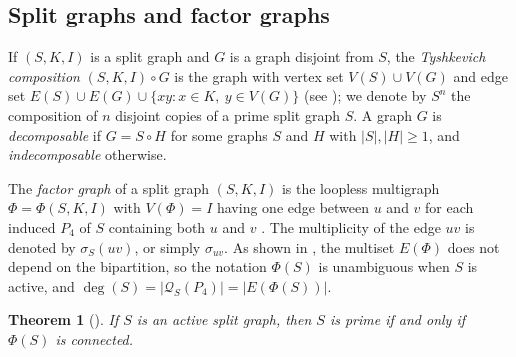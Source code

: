 \documentclass[11pt]{article}
\DeclareMathOperator{\act}{act}
\newtheorem{theorem}{Theorem}[section]
\newtheorem{corollary}[corollary]{Corollary}
\begin{document}

 


\subsection{Split graphs and factor graphs}

If $(S,K,I)$ is a split graph and $G$ is a graph disjoint from $S$, the
\emph{Tyshkevich composition} $(S,K,I)\circ G$ is the graph with vertex
set $V(S)\cup V(G)$ and edge set
$E(S)\cup E(G)\cup\{xy:x\in K,\ y\in V(G)\}$
(see \cite{tyshkevich2000decomposition}); we denote by $S^n$
the composition of $n$ disjoint copies of a prime split graph $S$. A graph $G$ is
\emph{decomposable} if $G=S\circ H$ for some graphs $S$ and $H$ with $|S|,|H|\geq 1$, and \emph{indecomposable} otherwise.

The \emph{factor graph} of a split graph $(S,K,I)$ is the loopless
multigraph $\Phi=\Phi(S,K,I)$ with $V(\Phi)=I$ having one edge between $u$
and $v$ for each induced $P_4$ of $S$ containing both $u$ and $v$
\cite{pastine2025simple}. The multiplicity of the edge $uv$ is denoted by
$\sigma_{S}(uv)$, or simply $\sigma_{uv}$. As shown in
\cite{pastine2025simple}, the multiset $E(\Phi)$ does not depend on the bipartition, so the notation $\Phi(S)$ is unambiguous when $S$ is active, and $\deg(S)=|\mathcal{Q}_S(P_4)|=|E(\Phi(S))|$. 

\begin{theorem}[\cite{pastine2025simple}]
	\label{S.primo.iff.Phi(S).conexo}
	If $S$ is an active split graph, then $S$ is prime if and only if $\Phi(S)$ is connected. 
%		
\end{theorem}
\end{document}

